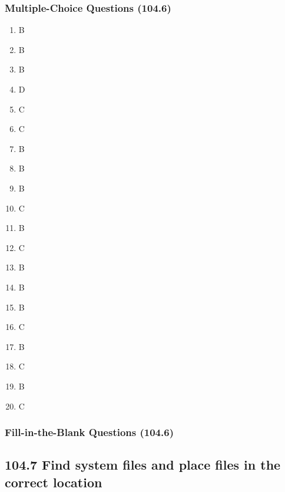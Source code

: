 \documentclass[a4paper]{report}
\begin{document}
\subsubsection*{Multiple-Choice Questions (104.6)}
\begin{enumerate}[1.]
    \item B
    \item B
    \item B
    \item D
    \item C
    \item C
    \item B
    \item B
    \item B
    \item C
    \item B
    \item C
    \item B
    \item B
    \item B
    \item C
    \item B
    \item C
    \item B
    \item C
\end{enumerate}

\subsubsection*{Fill-in-the-Blank Questions (104.6)}

\subsection*{104.7 Find system files and place files in the correct location}
\end{document}
